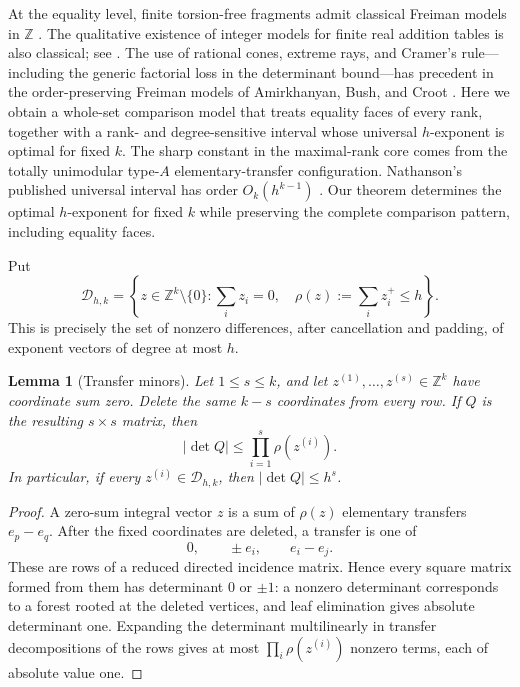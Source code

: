 \documentclass[11pt,reqno]{amsart}
\newtheorem{lemma}[theorem]{Lemma}
\theoremstyle{definition}
\theoremstyle{remark}
\begin{document}
At the equality level, finite torsion-free fragments admit classical Freiman
models in $\mathbb Z$
\cite[Part~II, Lemma~2.3.4]{GeroldingerRuzsa2009}.  The qualitative existence
of integer models for finite real addition tables is also classical; see
\cite{NathansonMSTD2018,OBryant2025}.  The use of rational cones, extreme
rays, and Cramer's rule---including the generic factorial loss in the
determinant bound---has precedent in the order-preserving Freiman models of
Amirkhanyan, Bush, and Croot \cite{AmirkhanyanBushCroot2018}.  Here we obtain
a whole-set comparison model that treats equality faces of every rank,
together with a rank- and degree-sensitive interval whose universal
$h$-exponent is optimal for fixed $k$.  The sharp constant in the
maximal-rank core comes from the totally unimodular type-$A$
elementary-transfer configuration.
Nathanson's published universal interval has order $O_k(h^{k-1})$
\cite{NathansonCompression}.  Our theorem determines the optimal
$h$-exponent for fixed $k$ while preserving the complete comparison pattern,
including equality faces.

Put
\[
 \mathcal D_{h,k}=\left\{z\in\mathbb Z^k\setminus\{0\}:
       \sum_i z_i=0,\quad \rho(z):=\sum_i z_i^+\leq h\right\}.
\]
This is precisely the set of nonzero differences, after cancellation and
padding, of exponent vectors of degree at most $h$.

\begin{lemma}[Transfer minors]\label{lem:transfer-minors-master}
Let $1\leq s\leq k$, and let
$z^{(1)},\ldots,z^{(s)}\in\mathbb Z^k$ have coordinate sum zero.  Delete
the same $k-s$ coordinates from every row.  If $Q$ is the resulting
$s\times s$ matrix, then
\begin{equation}\label{eq:transfer-minors-master}
 |\det Q|\leq\prod_{i=1}^s\rho(z^{(i)}).
\end{equation}
In particular, if every $z^{(i)}\in\mathcal D_{h,k}$, then
$|\det Q|\leq h^s$.
\end{lemma}

\begin{proof}
A zero-sum integral vector $z$ is a sum of $\rho(z)$ elementary transfers
$e_p-e_q$.  After the fixed coordinates are deleted, a transfer is one of
\[
 0,\qquad \pm e_i,\qquad e_i-e_j.
\]
These are rows of a reduced directed incidence matrix.  Hence every square
matrix formed from them has determinant $0$ or $\pm1$: a nonzero determinant
corresponds to a forest rooted at the deleted vertices, and leaf elimination
gives absolute determinant one.  Expanding the determinant multilinearly in
transfer decompositions of the rows gives at most
$\prod_i\rho(z^{(i)})$ nonzero terms, each of absolute value one.
\end{proof}
\end{document}
